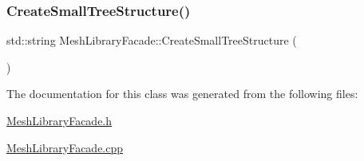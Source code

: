 \subsubsection{\texorpdfstring{CreateSmallTreeStructure()}{CreateSmallTreeStructure()}}
{\footnotesize\ttfamily std\+::string Mesh\+Library\+Facade\+::\+Create\+Small\+Tree\+Structure (\begin{DoxyParamCaption}{ }\end{DoxyParamCaption})}



The documentation for this class was generated from the following files\+:\begin{DoxyCompactItemize}
\item 
\mbox{\hyperlink{_mesh_library_facade_8h}{Mesh\+Library\+Facade.\+h}}\item 
\mbox{\hyperlink{_mesh_library_facade_8cpp}{Mesh\+Library\+Facade.\+cpp}}\end{DoxyCompactItemize}
